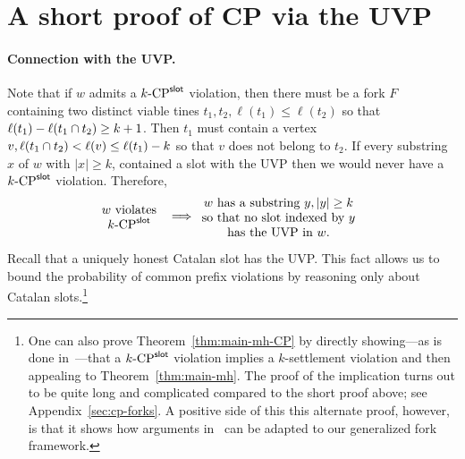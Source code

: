 \section{A short proof of CP via the UVP }

  \paragraph{Connection with the UVP.}
  Note that 
  if $w$ admits a ${k}\text{-}\mathrm{CP}^{\mathsf{slot}}$ violation, 
  then there must be a fork $F$ containing 
  two distinct viable tines $t_1, t_2, \ell(t_1) \leq \ell(t_2)$ 
  so that $\ell(t_1) - \ell(t_1 \cap t_2) \geq k + 1$. 
  Then $t_1$ must contain a vertex $v, \ell(t_1 \cap t_2) < \ell(v) \leq \ell(t_1) - k$ 
  so that $v$ does not belong to $t_2$. 
  If every substring $x$ of $w$ with $|x| \geq k$, contained a slot with the UVP then 
  we would never have a ${k}\text{-}\mathrm{CP}^{\mathsf{slot}}$ violation. 
  Therefore, 
  \begin{align}\label{eq:cp-uvp}
    \parbox{20mm}{\centering $w$ violates $\kSlotCP$}
    &\implies
    \parbox{45mm}{\centering
      $w$ has a substring $y, |y| \geq k$ so that 
      no slot indexed by $y$ has the UVP in $w$.
    }
  \end{align}


  Recall that a uniquely honest Catalan slot has the UVP. 
  This fact allows us to bound 
  the probability of common prefix violations by 
  reasoning only about Catalan slots.\footnote{ 
  One can also prove Theorem~\ref{thm:main-mh-CP} 
  by 
  directly showing---as is done in~\cite{LinearConsistency}---that 
  a ${k}\text{-}\mathrm{CP}^{\mathsf{slot}}$ violation implies a $k$-settlement violation 
  and then appealing to Theorem~\ref{thm:main-mh}. 
  The proof of the implication 
  turns out to be quite long and complicated 
  compared to the short proof above; 
  see Appendix~\ref{sec:cp-forks}.
  A positive side of this this alternate proof, however,  
  is that it shows how arguments in~\cite{LinearConsistency} 
  can be adapted to our generalized fork framework.
  }


